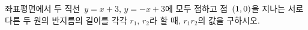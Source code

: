 좌표평면에서 두 직선~$y=x+3$, $y=-x+3$에 모두 접하고 점~$(1{,}\mkern3mu 0)$을 지나는 서로 다른 두 원의 반지름의 길이를 각각 $r_1$, $r_2$라 할 때, $r_1r_2$의 값을 구하시오.
